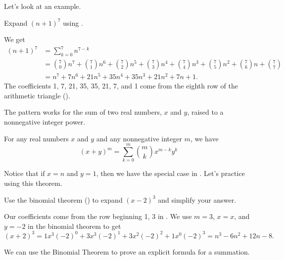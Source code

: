 Let's look at an example.

\begin{exam}
\label{exam_using_special_case_binom_formula}
    Expand $(n+1)^7$ using .
        \begin{soln}
            We get 
                \begin{align*}
                    (n+1)^7 & = \sum_{k=0}^7n^{7-k} \\
                    & = \binom{7}{0}n^7 + \binom{7}{1}n^6 + \binom{7}{2} n^5 + \binom{7}{3}n^4 + \binom{7}{4} n^3 + \binom{7}{5}n^2+ \binom{7}{6}n + \binom{7}{7} \\
                    & = n^7 + 7n^6 + 21n^5 + 35n^4 + 35n^3 + 21 n^2 + 7n+1.
                \end{align*}
            The coefficients 1, 7, 21, 35, 35, 21, 7, and 1 come from the eighth row of the arithmetic triangle ().
        \end{soln}
\end{exam}

The pattern works for the sum of two real numbers, $x$ and $y$, raised to a nonnegative integer power.

\begin{thm}
\label{thm_binomial_thm}
    For any real numbers $x$ and $y$ and any nonnegative integer $m$, we have
        $$(x+y)^m = \sum_{k=0}^m\binom{m}{k}x^{m-k}y^k$$
\end{thm}

Notice that if $x=n$ and $y=1$, then we have the special case in .  Let's practice using this theorem.

\begin{exam}
\label{exam_practice_binom_thm}
    Use the binomial theorem () to expand $(x-2)^3$ and simplify your answer.
        \begin{soln}
            Our coefficients come from the row beginning 1, 3 in .  We use $m=3$, $x=x$, and $y=-2$ in the binomial theorem to get            
                $$(x+2)^3=1x^3(-2)^0+3x^3(-2)^1+3x^2(-2)^2+1x^0(-2)^3= n^3-6n^2+12n-8.$$
            \end{soln}        
\end{exam}

We can use the Binomial Theorem to prove an explicit formula for a summation.

